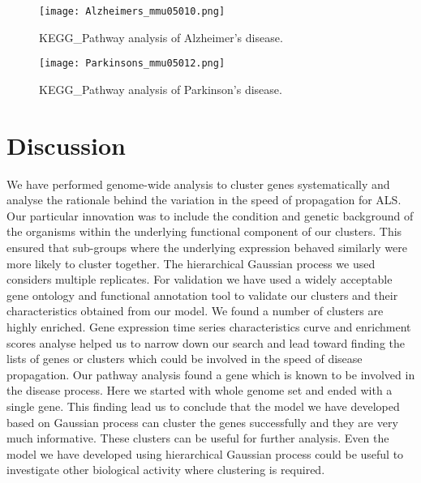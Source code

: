 \begin{figure}
 \begin{center}
 \texttt{[image: Alzheimers\_mmu05010.png]}
\caption {KEGG\_Pathway analysis of Alzheimer's disease. \label{AlzheimerPathwayAnalysis}}
 \end{center}
\end{figure}


\begin{figure}
 \begin{center}
 \texttt{[image: Parkinsons\_mmu05012.png]}
\caption {KEGG\_Pathway analysis of Parkinson's disease. \label{ParkinsonPathwayAnalysis}}
 \end{center}
\end{figure}


\section{Discussion}
We have performed genome-wide analysis to cluster genes systematically and analyse the rationale behind the variation in the speed of propagation for ALS. Our particular innovation was to include the condition and genetic background of the organisms within the underlying functional component of our clusters. This ensured that sub-groups where the underlying expression behaved similarly were more likely to cluster together. The hierarchical Gaussian process we used considers multiple replicates. For validation we have used a widely acceptable gene ontology and functional annotation tool to validate our clusters and their characteristics obtained from our model. We found a number of clusters are highly enriched. Gene expression time series characteristics curve and enrichment scores analyse helped us to narrow down our search and lead toward finding the lists of genes or clusters which could be involved in the speed of disease propagation. Our pathway analysis found a gene which is known to be involved in the disease process. Here we started with whole genome set and ended with a single gene. This finding lead us to conclude that the model we have developed based on Gaussian process can cluster the genes successfully and they are very much informative. These clusters can be useful for further analysis.  Even the model we have developed using hierarchical Gaussian process could be useful to investigate other biological activity where clustering is required. 
